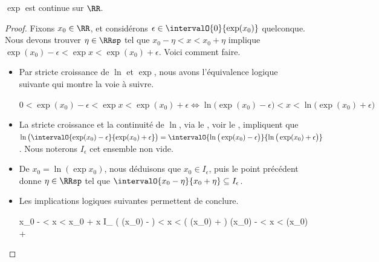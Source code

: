 \begin{fact} \label{exp-cont}
	$\exp$ est continue sur $\RR$.
\end{fact}


\begin{proof}
	Fixons $x_0 \in \RR$, et considérons $\epsilon \in \intervalO{0}{\exp(x_0)}$ quelconque.
	Nous devons trouver $\eta \in \RRsp$ tel que
	$x_0 - \eta < x < x_0 + \eta$
	implique
	$\exp(x_0) - \epsilon < \exp x < \exp(x_0) + \epsilon$. Voici comment faire.
	\begin{itemize}
		\item Par stricte croissance de $\ln$ et $\exp$, nous avons l'équivalence logique suivante qui montre la voie à suivre. 

		\noindent$
			0 < \exp(x_0) - \epsilon < \exp x < \exp(x_0) + \epsilon
			\iff
			\ln \big( \exp(x_0) - \epsilon \big) < x < \ln \big( \exp(x_0) + \epsilon \big)
		$


		\item La stricte croissance et la continuité de $\ln$, via le \tvi, voir le , impliquent que
		$\ln \big( \intervalO{\exp(x_0) - \epsilon}{\exp(x_0) + \epsilon} \big)
		=
		 \intervalO{\ln \big( \exp(x_0) - \epsilon \big)}{\ln \big( \exp(x_0) + \epsilon \big)}$.
		Nous noterons $I_{\epsilon}$ cet ensemble non vide.


		\item De $x_0 = \ln(\exp x_0)$, nous déduisons que $x_0 \in I_{\epsilon}$,
		puis le point précédent donne $\eta \in \RRsp$ tel que
		$\intervalO{x_0 - \eta}{x_0 + \eta} \subseteq I_{\epsilon}$.


		\item Les implications logiques suivantes permettent de conclure.
		
		\smallskip
		\leavevmode\kern-19pt\begin{stepcalc}[style=ar*, ope=\implies]
			x_0 - \eta < x < x_0 + \eta
		\explnext*{$\intervalO{x_0 - \eta}{x_0 + \eta} \subseteq I_{\epsilon}$}{}
			x \in I_{\epsilon}
		\explnext{}
			\ln \big( \exp(x_0) - \epsilon \big) < x < \ln \big( \exp(x_0) + \epsilon \big)
			\exp(x_0) - \epsilon < \exp x < \exp(x_0) + \epsilon
		\end{stepcalc}
	\end{itemize}
	
	\null
	\vspace{-4.5ex}
\end{proof}




